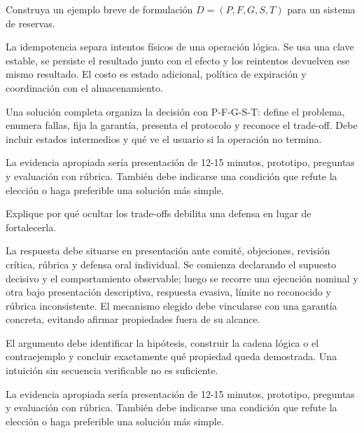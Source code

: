 \documentclass[variant=guia,cover=institutional,mode=screen]{ua-engineering-v6-article}
\begin{document}
\begin{uaexercise}
Construya un ejemplo breve de formulación $D=(P,F,G,S,T)$ para un sistema de reservas.
\end{uaexercise}
\begin{uaanswer}
La idempotencia separa intentos físicos de una operación lógica. Se usa una clave estable, se persiste el resultado junto con el efecto y los reintentos devuelven ese mismo resultado. El costo es estado adicional, política de expiración y coordinación con el almacenamiento.

Una solución completa organiza la decisión con P-F-G-S-T: define el problema, enumera fallas, fija la garantía, presenta el protocolo y reconoce el trade-off. Debe incluir estados intermedios y qué ve el usuario si la operación no termina.

La evidencia apropiada sería presentación de 12-15 minutos, prototipo, preguntas y evaluación con rúbrica. También debe indicarse una condición que refute la elección o haga preferible una solución más simple.
\end{uaanswer}

\begin{uaexercise}
Explique por qué ocultar los trade-offs debilita una defensa en lugar de fortalecerla.
\end{uaexercise}
\begin{uaanswer}
La respuesta debe situarse en presentación ante comité, objeciones, revisión crítica, rúbrica y defensa oral individual. Se comienza declarando el supuesto decisivo y el comportamiento observable; luego se recorre una ejecución nominal y otra bajo presentación descriptiva, respuesta evasiva, límite no reconocido y rúbrica inconsistente. El mecanismo elegido debe vincularse con una garantía concreta, evitando afirmar propiedades fuera de su alcance.

El argumento debe identificar la hipótesis, construir la cadena lógica o el contraejemplo y concluir exactamente qué propiedad queda demostrada. Una intuición sin secuencia verificable no es suficiente.

La evidencia apropiada sería presentación de 12-15 minutos, prototipo, preguntas y evaluación con rúbrica. También debe indicarse una condición que refute la elección o haga preferible una solución más simple.
\end{uaanswer}
\end{document}
